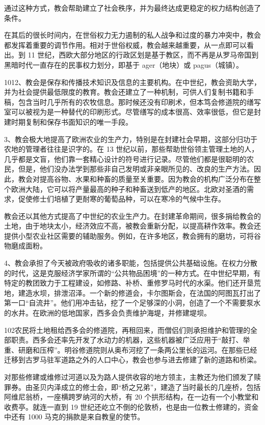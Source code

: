 通过这种方式，教会帮助建立了社会秩序，并为最终达成更稳定的权力结构创造了条件。

在其后的很长时间内，在世俗权力无力遏制的私人战争和过度的暴力冲突中，教会都发挥着重要的调节作用。相对于世俗权威，教会越来越重要，从一点即可以看出。到 11 世纪，西欧大部分地区的行政区划是基于教区，而不再是从罗马帝国到黑暗时代一直存在的民事权力划分，即基于 ager（地块）或 pagus（城镇）。

1012、教会是保存和传播技术知识及信息的主要机构。在中世纪，教会资助大学，并为社会提供最低限度的教育。教会还建立了一种机制，可供人们复制书籍和手稿，包含当时几乎所有的农牧信息。那时候还没有印刷术，但本笃会修道院的缮写室可以被视为是一种替代的印刷形式。尽管缮写的成本很高、效率很低，但它是封建时期复制和保存书面知识的唯一手段。

3、教会极大地提高了欧洲农业的生产力，特别是在封建社会早期，这部分归功于农地的管理者往往是识字的。在 13 世纪以前，那些帮助世俗领主管理土地的人，几乎都是文盲，他们靠一套精心设计的符号进行记录。尽管他们都是很聪明的农民，但是，他们没办法学到那些非自己发明或非亲眼所见的、改良的生产方法。因此，教会对提高谷物、水果和种畜的质量至关重要。因为教会的机构广泛分布在整个欧洲大陆，它可以将产量最高的种子和种畜送到低产的地区。北欧对圣酒的需求，促使修士们培植了更耐寒的葡萄品种，可以在寒冷的气候中生存。

教会还以其他方式提高了中世纪的农业生产力。在封建革命期间，很多捐给教会的土地，由于地块太小，经济效应不高，被教会重新分配，以提高耕作效率。教会还提供小型农业社区需要的辅助服务。例如，在许多地区，教会拥有的磨坊，可将谷物磨成面粉。

4、教会承担了今天被政府吸收的诸多职能，包括提供公共基础设施。在权力分散的时代，这是克服经济学家所谓的“公共物品困境”的一种方式。在中世纪早期，有特定的教团致力于工程建设，如修路、补桥、重修罗马时代的水渠。他们还开垦荒地，建造水坝，排泄沼泽。一个新的修道会，卡尔图斯会，在法国的阿图瓦打出了第一口“自流井”。他们用冲击钻，挖了一个足够深的小洞，创造了一个不需要泵水的水井。在欧洲的低地国家，西多会负责维护海堤，并修建堤坝。

102农民将土地租给西多会的修道院，再租回来，而僧侣们则承担维护和管理的全部职责。西多会还率先开发了水动力的机器，这些机器被广泛应用于“敲打、举重、研磨和压榨”。明谷修道院则从奥布河挖了一条两公里长的运河。在那些已经迁移到古罗马驻军道路之外的人口中心，教会也参与进去修建了新的道路和桥梁。

对那些修建或维修过河道以及为路人提供收容的地方领主，主教还为他们颁发了赎罪券。由圣贝内泽成立的修士会，即“桥之兄弟”，建造了当时最长的几座桥，包括阿维尼翁桥，一座横跨罗纳河的大桥，有 20 个拱形结构，在一边有一个小教堂和收费亭。就连一直到 19 世纪还屹立不倒的伦敦桥，也是由一位教士修建的，资金中还有 1000 马克的捐款是来自教皇的使节。

